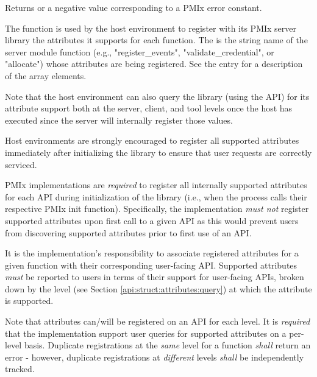 \begin{arglist}
\end{arglist}

Returns  or a negative value corresponding to a PMIx error constant.

\descr

The  function is used by the host environment to register with its \ac{PMIx} server library the attributes it supports for each  function. The  is the string name of the server module function (e.g., "register_events", "validate_credential", or "allocate") whose attributes are being registered. See the  entry for a description of the  array elements.

Note that the host environment can also query the library (using the  \ac{API}) for its attribute support both at the server, client, and tool levels once the host has executed  since the server will internally register those values.

\advicermstart
Host environments are strongly encouraged to register all supported attributes immediately after initializing the library to ensure that user requests are correctly serviced.
\advicermend

\adviceimplstart
\ac{PMIx} implementations are \emph{required} to register all internally supported attributes for each \ac{API} during initialization of the library (i.e., when the process calls their respective \ac{PMIx} init function). Specifically, the implementation \emph{must not} register supported attributes upon first call to a given \ac{API} as this would prevent users from discovering supported attributes prior to first use of an \ac{API}.

It is the implementation's responsibility to associate registered attributes for a given  function with their corresponding user-facing \ac{API}. Supported attributes \emph{must} be reported to users in terms of their support for user-facing \acp{API}, broken down by the level (see Section \ref{api:struct:attributes:query}) at which the attribute is supported.

Note that attributes can/will be registered on an \ac{API} for each level. It is \emph{required} that the implementation support user queries for supported attributes on a per-level basis. Duplicate registrations at the \emph{same} level for a function \emph{shall} return an error - however, duplicate registrations at \emph{different} levels \emph{shall} be independently tracked.
\adviceimplend

